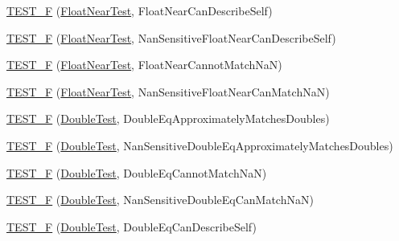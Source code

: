 \begin{DoxyCompactItemize}
\item 
\hyperlink{namespacetesting_1_1gmock__matchers__test_ad56232046efe7b4d5169a15fd15a2001}{T\+E\+S\+T\+\_\+F} (\hyperlink{namespacetesting_1_1gmock__matchers__test_a426b51f464dcb48033946e1bf3cc8795}{Float\+Near\+Test}, Float\+Near\+Can\+Describe\+Self)
\item 
\hyperlink{namespacetesting_1_1gmock__matchers__test_a4e90d53ea578d6b767559d8615a4c0c2}{T\+E\+S\+T\+\_\+F} (\hyperlink{namespacetesting_1_1gmock__matchers__test_a426b51f464dcb48033946e1bf3cc8795}{Float\+Near\+Test}, Nan\+Sensitive\+Float\+Near\+Can\+Describe\+Self)
\item 
\hyperlink{namespacetesting_1_1gmock__matchers__test_a2cd2ceebefa14a5d564a3bca60ed6572}{T\+E\+S\+T\+\_\+F} (\hyperlink{namespacetesting_1_1gmock__matchers__test_a426b51f464dcb48033946e1bf3cc8795}{Float\+Near\+Test}, Float\+Near\+Cannot\+Match\+NaN)
\item 
\hyperlink{namespacetesting_1_1gmock__matchers__test_ae7521865828fba53b45cc2819bec1273}{T\+E\+S\+T\+\_\+F} (\hyperlink{namespacetesting_1_1gmock__matchers__test_a426b51f464dcb48033946e1bf3cc8795}{Float\+Near\+Test}, Nan\+Sensitive\+Float\+Near\+Can\+Match\+NaN)
\item 
\hyperlink{namespacetesting_1_1gmock__matchers__test_a1b33dc485faca8c69184f3feb0476290}{T\+E\+S\+T\+\_\+F} (\hyperlink{namespacetesting_1_1gmock__matchers__test_a944cdd366ed240f29ae8e3ebc753ad5c}{Double\+Test}, Double\+Eq\+Approximately\+Matches\+Doubles)
\item 
\hyperlink{namespacetesting_1_1gmock__matchers__test_ab100ee4a4b0340e31212fb43c9e28255}{T\+E\+S\+T\+\_\+F} (\hyperlink{namespacetesting_1_1gmock__matchers__test_a944cdd366ed240f29ae8e3ebc753ad5c}{Double\+Test}, Nan\+Sensitive\+Double\+Eq\+Approximately\+Matches\+Doubles)
\item 
\hyperlink{namespacetesting_1_1gmock__matchers__test_a4c34f3f339de72d3f4f96a08a5125b59}{T\+E\+S\+T\+\_\+F} (\hyperlink{namespacetesting_1_1gmock__matchers__test_a944cdd366ed240f29ae8e3ebc753ad5c}{Double\+Test}, Double\+Eq\+Cannot\+Match\+NaN)
\item 
\hyperlink{namespacetesting_1_1gmock__matchers__test_ab42c199ae0008ce7550f584742caec28}{T\+E\+S\+T\+\_\+F} (\hyperlink{namespacetesting_1_1gmock__matchers__test_a944cdd366ed240f29ae8e3ebc753ad5c}{Double\+Test}, Nan\+Sensitive\+Double\+Eq\+Can\+Match\+NaN)
\item 
\hyperlink{namespacetesting_1_1gmock__matchers__test_a5975fb5a50e5364fe21422093680a559}{T\+E\+S\+T\+\_\+F} (\hyperlink{namespacetesting_1_1gmock__matchers__test_a944cdd366ed240f29ae8e3ebc753ad5c}{Double\+Test}, Double\+Eq\+Can\+Describe\+Self)

\end{DoxyCompactItemize}
